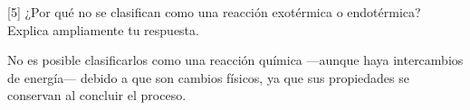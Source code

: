 [5] ¿Por qué no se clasifican como una reacción exotérmica o endotérmica? Explica ampliamente tu respuesta.

\begin{solutionorlines}
    No es posible clasificarlos como una reacción química —aunque haya intercambios de energía—  debido a que son cambios físicos, ya que sus propiedades se conservan al concluir el proceso.
\end{solutionorlines}